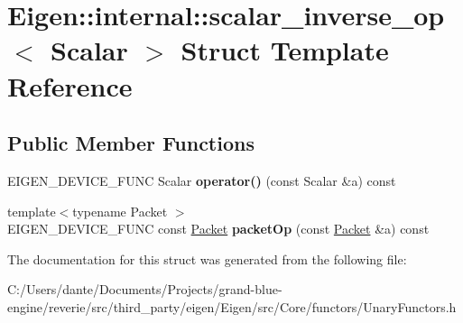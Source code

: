\hypertarget{struct_eigen_1_1internal_1_1scalar__inverse__op}{}\section{Eigen\+::internal\+::scalar\+\_\+inverse\+\_\+op$<$ Scalar $>$ Struct Template Reference}
\label{struct_eigen_1_1internal_1_1scalar__inverse__op}
\subsection*{Public Member Functions}
\begin{DoxyCompactItemize}
\item 
\mbox{\label{struct_eigen_1_1internal_1_1scalar__inverse__op_ac925a565dfb99c882cb2986423017355}} 
E\+I\+G\+E\+N\+\_\+\+D\+E\+V\+I\+C\+E\+\_\+\+F\+U\+NC Scalar {\bfseries operator()} (const Scalar \&a) const
\item 
\mbox{\label{struct_eigen_1_1internal_1_1scalar__inverse__op_ab7ebbcf96eee400820c795f4a3e9dd74}} 
{\footnotesize template$<$typename Packet $>$ }\\E\+I\+G\+E\+N\+\_\+\+D\+E\+V\+I\+C\+E\+\_\+\+F\+U\+NC const \mbox{\hyperlink{union_eigen_1_1internal_1_1_packet}{Packet}} {\bfseries packet\+Op} (const \mbox{\hyperlink{union_eigen_1_1internal_1_1_packet}{Packet}} \&a) const
\end{DoxyCompactItemize}


The documentation for this struct was generated from the following file\+:\begin{DoxyCompactItemize}
\item 
C\+:/\+Users/dante/\+Documents/\+Projects/grand-\/blue-\/engine/reverie/src/third\+\_\+party/eigen/\+Eigen/src/\+Core/functors/Unary\+Functors.\+h\end{DoxyCompactItemize}
